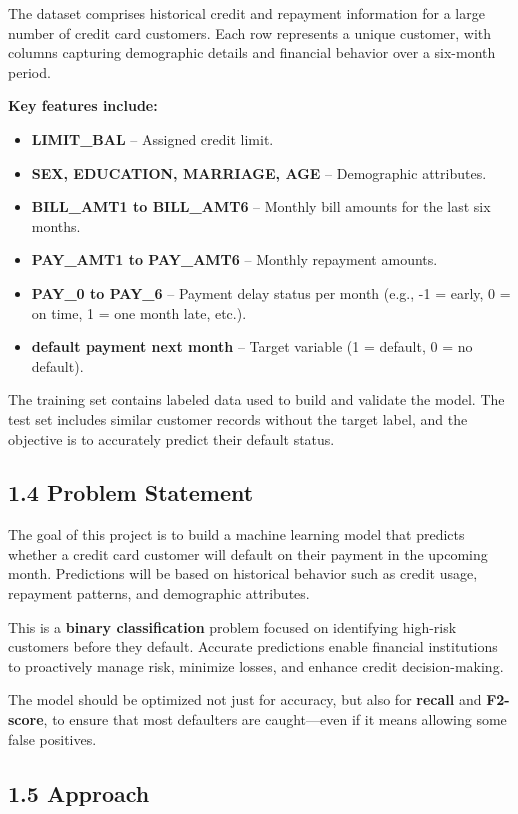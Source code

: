 \documentclass{article}
\begin{document}
The dataset comprises historical credit and repayment information for a large number of credit card customers. Each row represents a unique customer, with columns capturing demographic details and financial behavior over a six-month period.

\textbf{Key features include:}
\begin{itemize}
    \item \textbf{LIMIT\_BAL} – Assigned credit limit.
    \item \textbf{SEX, EDUCATION, MARRIAGE, AGE} – Demographic attributes.
    \item \textbf{BILL\_AMT1 to BILL\_AMT6} – Monthly bill amounts for the last six months.
    \item \textbf{PAY\_AMT1 to PAY\_AMT6} – Monthly repayment amounts.
    \item \textbf{PAY\_0 to PAY\_6} – Payment delay status per month (e.g., -1 = early, 0 = on time, 1 = one month late, etc.).
    \item \textbf{default payment next month} – Target variable (1 = default, 0 = no default).
\end{itemize}

The training set contains labeled data used to build and validate the model. The test set includes similar customer records without the target label, and the objective is to accurately predict their default status.

\subsection*{1.4 Problem Statement}

The goal of this project is to build a machine learning model that predicts whether a credit card customer will default on their payment in the upcoming month. Predictions will be based on historical behavior such as credit usage, repayment patterns, and demographic attributes.

This is a \textbf{binary classification} problem focused on identifying high-risk customers before they default. Accurate predictions enable financial institutions to proactively manage risk, minimize losses, and enhance credit decision-making.

The model should be optimized not just for accuracy, but also for \textbf{recall} and \textbf{F2-score}, to ensure that most defaulters are caught—even if it means allowing some false positives.

\subsection*{1.5 Approach}
\end{document}
